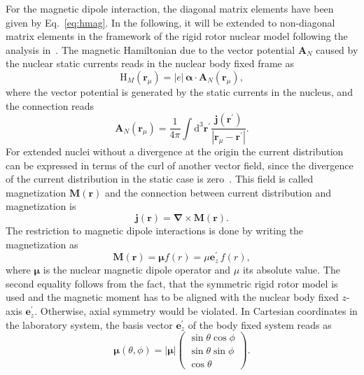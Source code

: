 For the magnetic dipole interaction, the diagonal matrix elements have been given by Eq.~\eqref{eq:hmag}. In the following, it will be extended to non-diagonal matrix elements in the framework of the rigid rotor nuclear model following the analysis in~\cite{Steffen1985}. The magnetic Hamiltonian due to the vector potential $\mathbf{A}_N$ caused by the nuclear static currents reads in the nuclear body fixed frame as
\begin{equation}
\label{eq:Hmag_rot}
\text{H}_{M}(\mathbf{r}_\mu) = |e|\,\boldsymbol{\alpha}\cdot \mathbf{A}_N(\mathbf{r}_\mu),
\end{equation}
where the vector potential is generated by the static currents in the nucleus, and the connection reads~\cite{jackson1999}
\begin{equation}
\mathbf{A}_N(\mathbf{r}_\mu) = \frac{1}{4\pi}\int\text{d}^3\mathbf{r}^\prime \frac{\mathbf{j}(\mathbf{r}^\prime)}{|\mathbf{r}_\mu-\mathbf{r}^\prime|}.
\end{equation}
For extended nuclei without a divergence at the origin the current distribution can be expressed in terms of the curl of another vector field, since the divergence of the current distribution in the static case is zero~\cite{jackson1999}. This field is called magnetization $\mathbf{M}(\mathbf{r})$ and the connection between current distribution and magnetization is
\begin{equation}
\mathbf{j}(\mathbf{r}) = \boldsymbol{\nabla} \times  \mathbf{M}(\mathbf{r}).
\end{equation}
The restriction to magnetic dipole interactions is done by writing the magnetization as
\begin{equation}
\mathbf{M}(\mathbf{r})=\boldsymbol{\mu}f(r)=\mu\mathbf{e}_z^\prime\,f(r),
\end{equation}
where $\boldsymbol{\mu}$ is the nuclear magnetic dipole operator and $\mu$ its absolute value. The second equality follows from the fact, that the symmetric rigid rotor model is used and the magnetic moment has to be aligned with the nuclear body fixed $z$-axis $\mathbf{e}_z^\prime$. Otherwise, axial symmetry would be violated.
In Cartesian coordinates in the laboratory system, the basis vector $\mathbf{e}_z^\prime$ of the body fixed system reads as
\begin{equation}
\label{eq:magMomOp}
\boldsymbol{\mu}(\theta,\phi)=|\boldsymbol{\mu}|
\begin{pmatrix}
\sin\theta\cos\phi \\ \sin\theta\sin\phi \\ \cos\theta
\end{pmatrix}.
\end{equation}
